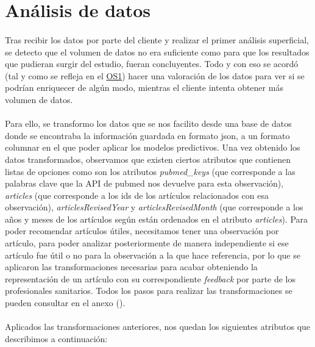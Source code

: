 \section{Análisis de datos}
\label{section:analisis_datos}

\paragraph{}
Tras recibir los datos por parte del cliente y realizar el primer análisis superficial, se detecto que el volumen de datos no era suficiente como para que los resultados que pudieran surgir del estudio, fueran concluyentes. Todo y con eso se acordó (tal y como se refleja en el \hyperref[os:OS1]{OS1}) hacer una valoración de los datos para ver si se podrían enriquecer de algún modo, mientras el cliente intenta obtener más volumen de datos.

\paragraph{}
Para ello, se transformo los datos que se nos facilito desde una base de datos donde se encontraba la información guardada en formato json, a un formato columnar en el que poder aplicar los modelos predictivos. Una vez obtenido los datos transformados, observamos que existen ciertos atributos que contienen listas de opciones como son los atributos \textit{pubmed\_keys} (que corresponde a las palabras clave que la API\cite{ref:pubmed_api} de pubmed nos devuelve para esta observación), \textit{articles} (que corresponde a los ids de los artículos relacionados con esa observación), \textit{articlesRevisedYear} y \textit{articlesRevisedMonth} (que corresponde a los años y meses de los artículos según están ordenados en el atributo \textit{articles}). Para poder recomendar artículos útiles, necesitamos tener una observación por artículo, para poder analizar posteriormente de manera independiente si ese artículo fue útil o no para la observación a la que hace referencia, por lo que se aplicaron las transformaciones necesarias para acabar obteniendo la representación de un artículo con su correspondiente \textit{feedback} por parte de los profesionales sanitarios. Todos los pasos para realizar las transformaciones se pueden consultar en el anexo ().

\paragraph{}
Aplicados las transformaciones anteriores, nos quedan los siguientes atributos que describimos a continuación:

